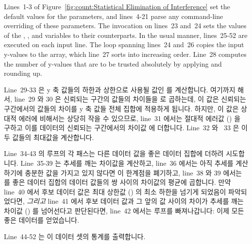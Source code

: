Lines~1-3 of
Figure~\ref{fig:count:Statistical Elimination of Interference}
set the default values for the parameters, and lines~4-21 parse
any command-line overriding of these parameters.
The  invocation on lines~23 and~24 sets the values of the
, , and  variables to their
 counterparts.
In the usual  manner, lines~25-52 are executed on each input
line.
The loop spanning lines~24 and~26 copies the input y-values to the
 array, which line~27 sorts into increasing order.
Line~28 computes the number of y-values that are to be trusted absolutely
by applying  and rounding up.
\fi

Line~29-33 은 y 축 값들의 하한과 상한으로 사용될 값인  를
계산합니다.
여기까지 해서, line~29 와 30 은 신뢰되는 구간의 값들의 차이들을  로
곱하는데, 이 값은 신뢰되는 구간에서의 값들의 차이를 y 축 값들 전체 집합에
적용하게 됩니다.
하지만, 이 값은 상대적 에러에 비해서는 상당히 작을 수 있으므로, line~31 에서는
절대적 에러값 () 을 구하고 이를 데이터의 신뢰되는 구간에서의
차이값  에 더합니다.
Line~32 와 ~33 은 이 두 값들의 최대값을 계산합니다.

Line~34-43 의 루프의 각 패스는 다른 데이터 값을 좋은 데이터 집합에 더하려
시도합니다.
Line~35-39 는 추세를 깨는 차이값을 계산하고, line~36 에서는 아직 추세를
계산하기에 충분한 값을 가지고 있지 않다면 이 한계점을 폐기하고, line~38 와 39
에서는  를 좋은 데이터 집합의 데이터 값들의 쌍 사이의 차이값의
평균에 곱합니다.
만약 line~40 에서 후보 데이터 값은 최대 상한값 () 의 최소 하한을
넘기게 되었음이 파악되었다면, \emph{그리고} line~41 에서 후보 데이터 값과 그
앞의 값 사이의 차이가 추세를 깨는 차이값 () 를 넘어선다고
판단된다면, line~42 에서는 루프를 빠져나갑니다: 이제 모든 좋은 데이터를
얻었습니다.

Line~44-52 는 이 데이터 셋의 통계를 출력합니다.
\iffalse

